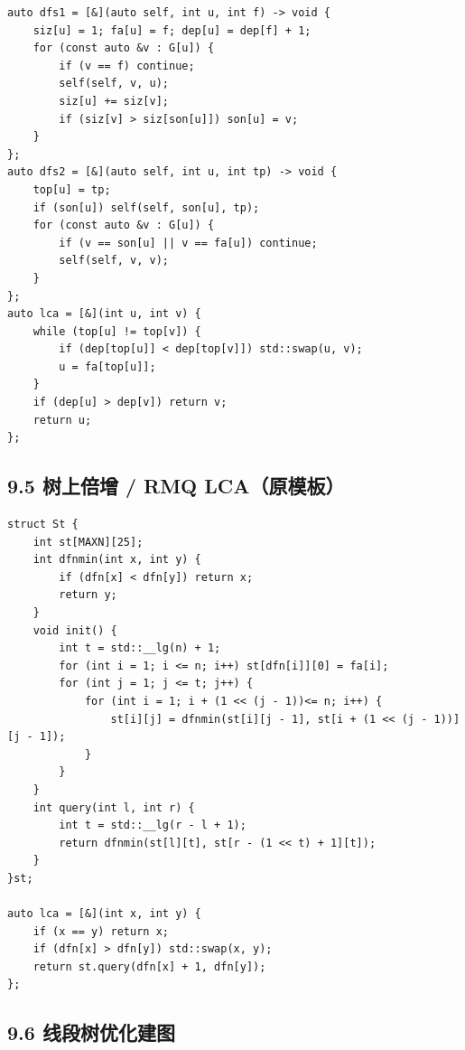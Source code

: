 \documentclass[UTF8,a4paper,11pt]{ctexart}
\begin{document}
\begin{Verbatim}[fontsize=\small,frame=single,breaklines=true,breakanywhere=true]
auto dfs1 = [&](auto self, int u, int f) -> void {
    siz[u] = 1; fa[u] = f; dep[u] = dep[f] + 1;
    for (const auto &v : G[u]) {
        if (v == f) continue;
        self(self, v, u);
        siz[u] += siz[v];
        if (siz[v] > siz[son[u]]) son[u] = v; 
    }
};
auto dfs2 = [&](auto self, int u, int tp) -> void {
    top[u] = tp;
    if (son[u]) self(self, son[u], tp);
    for (const auto &v : G[u]) {
        if (v == son[u] || v == fa[u]) continue;
        self(self, v, v);
    }
};
auto lca = [&](int u, int v) {
    while (top[u] != top[v]) {
        if (dep[top[u]] < dep[top[v]]) std::swap(u, v);
        u = fa[top[u]];
    }
    if (dep[u] > dep[v]) return v;
    return u;
};
\end{Verbatim}

\subsection*{9.5 树上倍增 / RMQ LCA（原模板）}

\begin{Verbatim}[fontsize=\small,frame=single,breaklines=true,breakanywhere=true]
struct St {
    int st[MAXN][25];
    int dfnmin(int x, int y) {
        if (dfn[x] < dfn[y]) return x;
        return y; 
    }
    void init() {
        int t = std::__lg(n) + 1;
        for (int i = 1; i <= n; i++) st[dfn[i]][0] = fa[i];
        for (int j = 1; j <= t; j++) {
            for (int i = 1; i + (1 << (j - 1))<= n; i++) {
                st[i][j] = dfnmin(st[i][j - 1], st[i + (1 << (j - 1))][j - 1]);
            }
        }
    }
    int query(int l, int r) {
        int t = std::__lg(r - l + 1);
        return dfnmin(st[l][t], st[r - (1 << t) + 1][t]);
    }
}st;

auto lca = [&](int x, int y) {
    if (x == y) return x;
    if (dfn[x] > dfn[y]) std::swap(x, y);
    return st.query(dfn[x] + 1, dfn[y]);
};
\end{Verbatim}


\subsection*{9.6 线段树优化建图}
\end{document}
